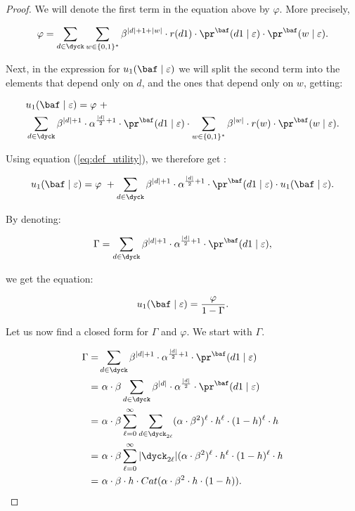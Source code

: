 \begin{proof}
We will denote the first term in the equation above by $\varphi$. More precisely,

$$\varphi = \sum_{d\in \dyck}  \sum_{w\in \{0,1\}^*}\beta^{|d|+1+|w|}\cdot r(d1) \cdot \pr^{\baf}(d1\mid \varepsilon)\cdot \pr^{\baf}(w\mid \varepsilon).$$

Next, in the expression for $u_1(\baf\mid\varepsilon)$ we will split the second term into the elements that depend only on $d$, and the ones that depend only on $w$, getting:

\begin{align*}
 & u_1(\baf\mid\varepsilon) = \varphi \mbox{ } +\\
 & \sum_{d\in \dyck} \beta^{|d|+1}\cdot  \alpha^{\frac{|d|}{2}+1}\cdot \pr^{\baf}(d1\mid \varepsilon) \cdot 
 \sum_{w\in \{0,1\}^*} \beta^{|w|} \cdot r(w)  \cdot \pr^{\baf}(w\mid \varepsilon).
\end{align*}

Using equation (\ref{eq:def_utility}), we therefore get :

\begin{align*}
 u_1(\baf\mid\varepsilon) = \varphi \mbox{ } + 
 \sum_{d\in \dyck} \beta^{|d|+1}\cdot  \alpha^{\frac{|d|}{2}+1}\cdot \pr^{\baf}(d1\mid \varepsilon) \cdot  u_1(\baf\mid\varepsilon).
\end{align*}

By denoting:

$$\Gamma = \sum_{d\in \dyck} \beta^{|d|+1}\cdot  \alpha^{\frac{|d|}{2}+1}\cdot \pr^{\baf}(d1\mid \varepsilon),$$

we get the equation:

$$u_1(\baf\mid\varepsilon) = \frac{\varphi}{1-\Gamma}.$$

Let us now find a closed form for $\Gamma$ and $\varphi$. We start with $\Gamma$.

\begin{align*}
\Gamma = & \sum_{d\in \dyck} \beta^{|d|+1}\cdot  \alpha^{\frac{|d|}{2}+1}\cdot \pr^{\baf}(d1\mid \varepsilon)\\
 = & \mbox{ } \alpha\cdot \beta \sum_{d\in \dyck} \beta^{|d|}\cdot  \alpha^{\frac{|d|}{2}}\cdot \pr^{\baf}(d1\mid \varepsilon) \\
  = & \mbox{ } \alpha\cdot \beta \sum_{\ell = 0}^{\infty} \sum_{d\in \dyck_{2\ell}} (\alpha\cdot \beta^2)^{\ell}\cdot h^{\ell}\cdot (1-h)^{\ell}\cdot h\\
   = & \mbox{ } \alpha\cdot \beta \sum_{\ell = 0}^{\infty} |\dyck_{2\ell}| (\alpha\cdot \beta^2)^{\ell}\cdot h^{\ell}\cdot (1-h)^{\ell}\cdot h\\
    = & \mbox{ } \alpha\cdot \beta \cdot h \cdot Cat(\alpha\cdot\beta^2 \cdot h \cdot (1-h)).\\
\end{align*}


\end{proof}
